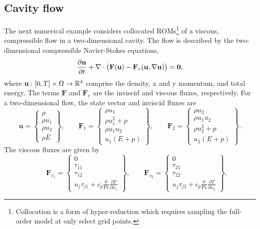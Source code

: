 \subsection{Cavity flow}
The next numerical example considers collocated ROMs\footnote{Collocation is a form of hyper-reduction which requires sampling the full-order model at only select grid points.} of a viscous, compressible flow in a two-dimensional cavity. 
The flow is described by the two-dimensional compressible Navier-Stokes equations,
\begin{equation}\label{eq:compressible_ns}
\frac{\partial \mathbf{u}}{\partial t} + \nabla \cdot \big( \mathbf{F}(\mathbf{u} ) - \mathbf{F}_v (\mathbf{u},\nabla \mathbf{u} )      \big) =\boldsymbol 0,
\end{equation}
where $\mathbf{u}: [0,T] \times \Omega \rightarrow \mathbb{R}^{4}$ comprise the density, x and y momentum, and total energy. The terms $\mathbf{F}$ and $ \mathbf{F}_v$ are the inviscid and viscous fluxes, respectively. For a two-dimensional flow, the state vector and inviscid fluxes are
$$
\mathbf{u} = \begin{Bmatrix}
\rho \\ \rho u_1 \\ \rho u_2 \\ \rho E \end{Bmatrix}, \qquad \mathbf{F}_{1} = \begin{Bmatrix} \rho u_1 \\ \rho u_1^2 +      p \\ \rho u_1 u_2 \\ u_1(E + p) \end{Bmatrix}, 
\qquad \mathbf{F}_{2} = \begin{Bmatrix} \rho u_2 \\ \rho u_1 u_2  \\ \rho u_2^2 + p \\ u_2(E + p) \end{Bmatrix}.
$$
The viscous fluxes are given by
$$
\qquad \mathbf{F}_{v_1} = \begin{Bmatrix} 0 \\ \tau_{11} \\ \tau_{12}  \\ u_j \tau_{j1} + c_p \frac{\mu}{\text{Pr}} \frac{\partial T}{\partial x_1}  \end{Bmatrix}, 
\qquad \mathbf{F}_{v_2} = \begin{Bmatrix} 0 \\ \tau_{21} \\ \tau_{22}  \\ u_j \tau_{j2} + c_p \frac{\mu}{\text{Pr}} \frac{\partial T}{\partial x_2}  \end{Bmatrix},
$$

